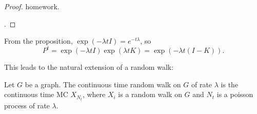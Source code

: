\begin{proof}
homework.

. 
\end{proof}

From the proposition, $\exp(-\lambda t I) = e^{-t\lambda}$, so
\[P^t = \exp(-\lambda t I)\exp(\lambda t K) = \exp(-\lambda t(I-K)).\] 

This leads to the natural extension of a random walk: 
\begin{example}
\exlabel

Let $G$ be a graph. The continuous time random walk on $G$ of rate $\lambda$ is the continuous time MC $X_{N_t}$, where $X_i$ is a random walk on $G$ and $N_t$ is a poisson process of rate $\lambda$. 
\end{example}
